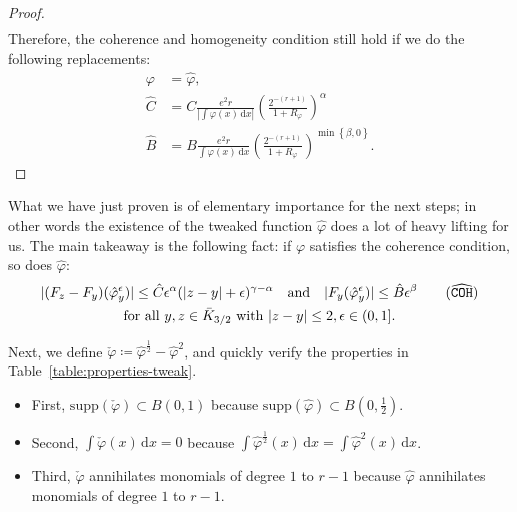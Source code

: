 \begin{proof}
\begin{align*}
    \end{align*}
    Therefore, the coherence and homogeneity condition still hold if we do the following replacements:
    \begin{align}
        \varphi &= \hat \varphi, \nonumber
        \\
        \hat C &= C\frac{e^2 r}{|\int \varphi(x)\, \mathrm{d}x|} \left(\frac{2^{-(r+1)}}{1+R_\varphi}\right)^\alpha \label{constant:hat-c}
        \\
        \hat B &= B\frac{e^2 r}{\int \varphi(x)\, \mathrm{d}x} \left(\frac{2^{-(r+1)}}{1+R_\varphi}\right)^{\min\left\{ \beta, 0 \right\} } \nonumber.
    \end{align}
\end{proof}

What we have just proven is of elementary importance for the next steps; in other words the existence of the tweaked function \(\hat \varphi\) does a lot of heavy lifting for us. The main takeaway is the following fact: if \(\varphi\) satisfies the coherence condition, so does \(\hat \varphi\):
\begin{gather}\label{coherence-hat}
    |(F_z - F_y)(\hat \varphi^\epsilon_y)| \leq \hat C \epsilon^\alpha(|z-y| + \epsilon)^{\gamma - \alpha} \quad \text{and} \quad |F_y(\hat \varphi^\epsilon_y)| \leq \hat B\epsilon^\beta \tag{\({\widehat{\texttt{COH}}}\)} \\
    \text{for all } y,z \in \bar K_{3/2} \text{ with } |z-y| \leq 2,  \epsilon \in (0,1] .\nonumber
\end{gather}

Next, we define \(\check \varphi \coloneqq \hat \varphi^{\frac{1}{2}} - \hat \varphi^2\), and quickly verify the properties in Table~\ref{table:properties-tweak}.
\begin{itemize}
    \item First, \(\mathrm{supp}(\check \varphi) \subset B(0,1)\) because \(\mathrm{supp}(\hat \varphi) \subset B(0,\frac{1}{2})\).
    \item Second, \(\int \check \varphi(x) \, \mathrm{d}x = 0\) because \(\int \hat \varphi^{\frac{1}{2}}(x) \, \mathrm{d}x = \int \hat \varphi^2(x) \, \mathrm{d}x\).
    \item Third, \(\check \varphi\) annihilates monomials of degree \(1\) to \(r-1\) because  \(\hat \varphi\) annihilates monomials of degree \(1\) to \(r-1\).
\end{itemize}

